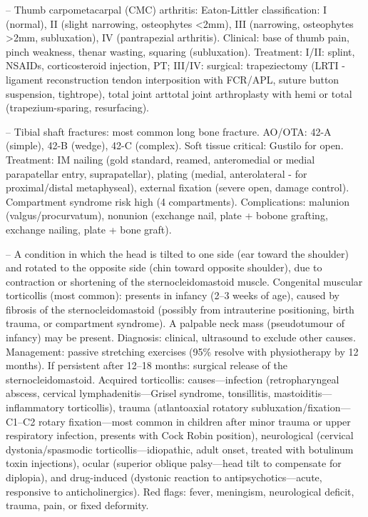 -- Thumb carpometacarpal (CMC) arthritis: Eaton-Littler classification: I (normal), II (slight narrowing, osteophytes <2mm), III (narrowing, osteophytes >2mm, subluxation), IV (pantrapezial arthritis). Clinical: base of thumb pain, pinch weakness, thenar wasting, squaring (subluxation). Treatment: I/II: splint, NSAIDs, corticosteroid injection, PT; III/IV: surgical: trapeziectomy (LRTI - ligament reconstruction tendon interposition with FCR/APL, suture button suspension, tightrope), total joint arttotal joint arthroplasty with hemi or total (trapezium-sparing, resurfacing).

-- Tibial shaft fractures: most common long bone fracture. AO/OTA: 42-A (simple), 42-B (wedge), 42-C (complex). Soft tissue critical: Gustilo for open. Treatment: IM nailing (gold standard, reamed, anteromedial or medial parapatellar entry, suprapatellar), plating (medial, anterolateral - for proximal/distal metaphyseal), external fixation (severe open, damage control). Compartment syndrome risk high (4 compartments). Complications: malunion (valgus/procurvatum), nonunion (exchange nail, plate + bobone grafting, exchange nailing, plate + bone graft).

-- A condition in which the head is tilted to one side (ear toward the shoulder) and rotated to the opposite side (chin toward opposite shoulder), due to contraction or shortening of the sternocleidomastoid muscle. Congenital muscular torticollis (most common): presents in infancy (2--3 weeks of age), caused by fibrosis of the sternocleidomastoid (possibly from intrauterine positioning, birth trauma, or compartment syndrome). A palpable neck mass (pseudotumour of infancy) may be present. Diagnosis: clinical, ultrasound to exclude other causes. Management: passive stretching exercises (95\% resolve with physiotherapy by 12 months). If persistent after 12--18 months: surgical release of the sternocleidomastoid. Acquired torticollis: causes—infection (retropharyngeal abscess, cervical lymphadenitis—Grisel syndrome, tonsillitis, mastoiditis—inflammatory torticollis), trauma (atlantoaxial rotatory subluxation/fixation—C1--C2 rotary fixation—most common in children after minor trauma or upper respiratory infection, presents with Cock Robin position), neurological (cervical dystonia/spasmodic torticollis—idiopathic, adult onset, treated with botulinum toxin injections), ocular (superior oblique palsy—head tilt to compensate for diplopia), and drug-induced (dystonic reaction to antipsychotics—acute, responsive to anticholinergics). Red flags: fever, meningism, neurological deficit, trauma, pain, or fixed deformity.

